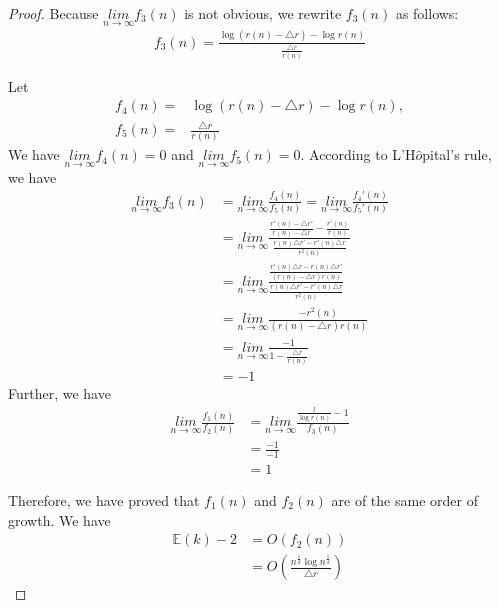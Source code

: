 \documentclass{vldb}
\begin{document}
\begin{appendix}
\begin{proof}
Because $\underset{n\rightarrow \infty}{lim}f_3(n)$ is not obvious, we rewrite $f_3(n)$ as follows:
\begin{align*}
f_3(n) = \frac{\log (r(n) - \triangle{r}) - \log r(n)}{\frac{\triangle{r}}{r(n)}}
\end{align*}

Let
\begin{align*}
f_4(n) = &\log (r(n) - \triangle{r}) - \log r(n),\\
f_5(n) = &\frac{\triangle{r}}{r(n)}
\end{align*}
We have $\underset{n\rightarrow \infty}{lim}f_4(n) = 0$ and $\underset{n\rightarrow \infty}{lim}f_5(n) = 0$. According to L'H$\hat{o}$pital's rule, we have
\begin{align*}
\underset{n\rightarrow \infty}{lim}f_3(n)& =\underset{n\rightarrow \infty}{lim}\frac{f_4(n)}{f_5(n)} = \underset{n\rightarrow \infty}{lim}\frac{f_4'(n)}{f_5'(n)}\\
									       & =  \underset{n\rightarrow \infty}{lim}\frac{\frac{r'(n) - \triangle{r}'}{r(n) - \triangle{r}} - \frac{r'(n)}{r(n)}}{\frac{r(n)\triangle{r}' - r'(n)\triangle{r}}{r^2(n)}}\\
									       & = \underset{n\rightarrow \infty}{lim}\frac{\frac{r'(n)\triangle{r}-r(n)\triangle{r}'}{(r(n) - \triangle{r})r(n)}}{\frac{r(n)\triangle{r}' - r'(n)\triangle{r}}{r^2(n)}}\\
									       & = \underset{n\rightarrow \infty}{lim}\frac{-r^2(n)}{(r(n) - \triangle{r})r(n)}\\
									       & = \underset{n\rightarrow \infty}{lim}\frac{-1}{1 - \frac{\triangle{r}}{r(n)}}\\
									       & = -1
\end{align*}
Further, we have
\begin{align*}
\underset{n\rightarrow \infty}{lim}\frac{f_1(n)}{f_2(n)} &= \underset{n\rightarrow \infty}{lim}\frac{\frac{l}{\log r(n)}-1}{f_3(n)}\\
									        &= \frac{-1}{-1}\\
									        &= 1
\end{align*}

Therefore, we have proved that $f_1(n)$ and $f_2(n)$ are of the same order of growth. We have
\begin{align*}
\mathbb{E}(k) - 2 &= O(f_2(n))\\
			   &= O(\frac{n^{\frac{1}{d}}\log n^{\frac{1}{d}}}{\triangle{r}})
\end{align*}


\end{proof}
\end{appendix}
\end{document}
